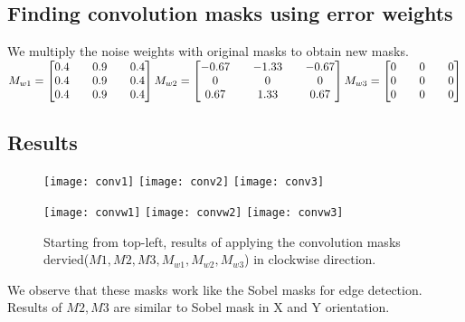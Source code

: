 \documentclass[paper=a4, fontsize=11pt]{scrartcl} %
\numberwithin{equation}{section} %
\numberwithin{figure}{section} %
\numberwithin{table}{section} %
\begin{document}
    \subsection{Finding convolution masks using error weights}
    We multiply the noise weights with original masks to obtain new masks.
    \\
    \(
      M_{w1} = \begin{bmatrix}
            0.4 && 0.9 && 0.4\\
            0.4 && 0.9 && 0.4\\
            0.4 && 0.9 && 0.4
          \end{bmatrix}
      \\
      M_{w2} = \begin{bmatrix}
            -0.67 && -1.33 && -0.67\\
              0 && 0 && 0  \\
             0.67 && 1.33 && 0.67
          \end{bmatrix}
      \\
      M_{w3} = \begin{bmatrix}
            0 &&  0 && 0 \\ 
            0 && 0 &&  0 \\ 
            0 && 0 &&  0
          \end{bmatrix}
    \)
    \subsection{Results}

    \begin{figure}[h!]
        \centering
        \texttt{[image: conv1]}
        \texttt{[image: conv2]}
        \texttt{[image: conv3]}

        \texttt{[image: convw1]}
        \texttt{[image: convw2]}
        \texttt{[image: convw3]}

        \caption{Starting from top-left, results of applying the convolution masks dervied(\(M1,M2,M3,M_{w1}, M_{w2}, M_{w3}\)) in clockwise direction. }
    \end{figure}
        We observe that these masks work like the Sobel masks for edge detection. Results of \(M2, M3\) are similar to Sobel mask in X and Y orientation.
\end{document}
